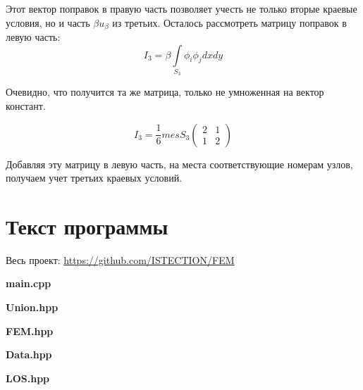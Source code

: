 \documentclass[12pt,a4paper]{article}
\begin{document}
\noindent Этот вектор поправок в правую
часть позволяет учесть не только вторые
краевые условия, но и часть
$\beta u_{\beta}$ из третьих.
Осталось рассмотреть матрицу
поправок в левую часть:
$$
I_3 = \beta \int \limits_{S_3}
\phi_i \phi_j dxdy
$$

\noindent Очевидно, что получится та же
матрица, только не умноженная на вектор
констант.

$$
I_3 = \frac{1}{6} mes S_3
\begin{pmatrix}
    2 & 1 \\
    1 & 2
\end{pmatrix}
$$

\noindent Добавляя эту матрицу в левую часть,
на места соответствующие номерам узлов,
получаем учет третьих краевых условий.


\newpage
\section{Текст программы}

Весь проект:
\href{https://github.com/ISTECTION/FEM}{https://github.com/ISTECTION/FEM}

\begin{myquote}
    \begin{center}
        \textbf{main.cpp}
    \end{center}
\end{myquote}

\begin{myquote}
    \begin{center}
        \textbf{Union.hpp}
    \end{center}
\end{myquote}

\begin{myquote}
    \begin{center}
        \textbf{FEM.hpp}
    \end{center}
\end{myquote}

\begin{myquote}
    \begin{center}
        \textbf{Data.hpp}
    \end{center}
\end{myquote}

\begin{myquote}
    \begin{center}
        \textbf{LOS.hpp}
    \end{center}
\end{myquote}
\end{document}
